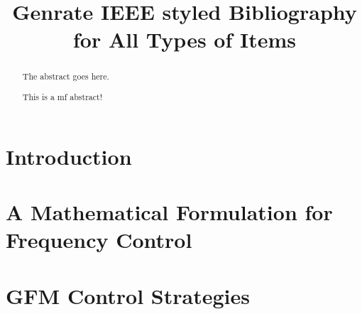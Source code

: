 \documentclass[conference]{IEEEtran}
\begin{document}
\title{Genrate IEEE styled Bibliography for All Types of  Items}
\maketitle

\begin{abstract}
The abstract goes here.

This is a mf abstract!
\end{abstract}

\section{Introduction}

\section{A Mathematical Formulation for Frequency Control}

\section{GFM Control Strategies}




\end{document}
